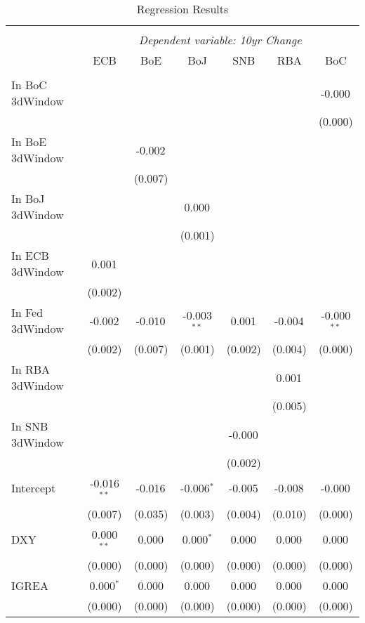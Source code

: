 \begin{table}[!htbp] \centering
  \caption{Regression Results}
\begin{adjustbox}{width=0.75\textwidth}
\begin{tabular}{@{\extracolsep{5pt}}lcccccc}
\\[-1.8ex]\hline
\hline \\[-1.8ex]
& \multicolumn{6}{c}{\textit{Dependent variable: 10yr Change}} \
\cr \cline{2-7}
\\[-1.8ex] & \multicolumn{1}{c}{ECB} & \multicolumn{1}{c}{BoE} & \multicolumn{1}{c}{BoJ} & \multicolumn{1}{c}{SNB} & \multicolumn{1}{c}{RBA} & \multicolumn{1}{c}{BoC}  \\
\hline \\[-1.8ex]
 In BoC 3dWindow & & & & & & -0.000$^{}$ \\
& & & & & & (0.000) \\
 In BoE 3dWindow & & -0.002$^{}$ & & & & \\
& & (0.007) & & & & \\
 In BoJ 3dWindow & & & 0.000$^{}$ & & & \\
& & & (0.001) & & & \\
 In ECB 3dWindow & 0.001$^{}$ & & & & & \\
& (0.002) & & & & & \\
 In Fed 3dWindow & -0.002$^{}$ & -0.010$^{}$ & -0.003$^{**}$ & 0.001$^{}$ & -0.004$^{}$ & -0.000$^{**}$ \\
& (0.002) & (0.007) & (0.001) & (0.002) & (0.004) & (0.000) \\
 In RBA 3dWindow & & & & & 0.001$^{}$ & \\
& & & & & (0.005) & \\
 In SNB 3dWindow & & & & -0.000$^{}$ & & \\
& & & & (0.002) & & \\
 Intercept & -0.016$^{**}$ & -0.016$^{}$ & -0.006$^{*}$ & -0.005$^{}$ & -0.008$^{}$ & -0.000$^{}$ \\
& (0.007) & (0.035) & (0.003) & (0.004) & (0.010) & (0.000) \\
 DXY & 0.000$^{**}$ & 0.000$^{}$ & 0.000$^{*}$ & 0.000$^{}$ & 0.000$^{}$ & 0.000$^{}$ \\
& (0.000) & (0.000) & (0.000) & (0.000) & (0.000) & (0.000) \\
 IGREA & 0.000$^{*}$ & 0.000$^{}$ & 0.000$^{}$ & 0.000$^{}$ & 0.000$^{}$ & 0.000$^{}$ \\
& (0.000) & (0.000) & (0.000) & (0.000) & (0.000) & (0.000) \\

\end{tabular}
\end{adjustbox}
\end{table}
